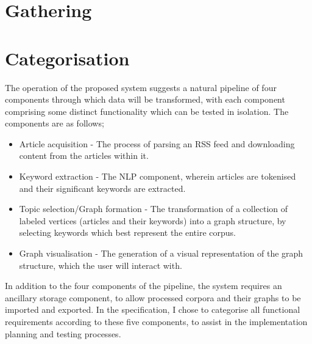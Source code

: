 \section{Gathering}

\section{Categorisation}
The operation of the proposed system suggests a natural pipeline of four components through which data will be transformed, with each component comprising some distinct functionality which can be tested in isolation. The components are as follows;
\begin{itemize}
	\item Article acquisition - The process of parsing an RSS feed and downloading content from the articles within it.
	\item Keyword extraction - The NLP component, wherein articles are tokenised and their significant keywords are extracted.
	\item Topic selection/Graph formation - The transformation of a collection of labeled vertices (articles and their keywords) into a graph structure, by selecting keywords which best represent the entire corpus.
	\item Graph visualisation - The generation of a visual representation of the graph structure, which the user will interact with.
\end{itemize}
In addition to the four components of the pipeline, the system requires an ancillary storage component, to allow processed corpora and their graphs to be imported and exported. In the specification, I chose to categorise all functional requirements according to these five components, to assist in the implementation planning and testing processes.

